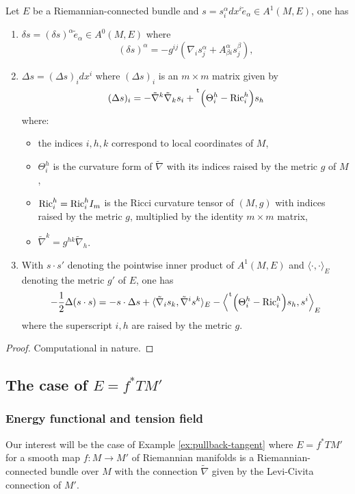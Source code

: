 \begin{lemma}
\label{lem:calculs-general}
Let \(E\) be a Riemannian-connected bundle and \(s = s^\alpha_i dx^i \tilde e_\alpha\in A^1(M,E)\), one has
\begin{enumerate}
\item \(\delta s = (\delta s)^\alpha \tilde e_\alpha \in A^0(M,E)\) where
\[
    (\delta s)^\alpha = -g^{ij}\left(\nabla_i s^\alpha_j + A^\alpha_{\beta i} s^\beta_j \right),
   \]
\item \(\Delta s = (\Delta s)_i dx^i\) where \((\Delta s)_i\) is an \(m\times m\)
matrix given by
\[
    (\Delta s)_i = -{\tilde\nabla}^k {\tilde\nabla}_k s_i + \mskip1mu\prescript{\smash{\mathrm t\mkern-3mu}}{}{\mathstrut\left(\Theta_i^h - {\rm
   Ric}_i^h\right)} s_h
   \]
where:
\begin{itemize}
\item the indices \(i,h,k\) correspond to local coordinates of \(M\),
\item \(\Theta_i^h\) is the curvature form of \(\tilde\nabla\) with its
indices raised by the metric \(g\) of \(M\),
\item \({\rm Ric}_i^h = {\rm Ric}_i^h I_m\) is the Ricci curvature tensor of \((M,g)\) with indices
raised by the metric \(g\), multiplied by the identity \(m\times m\) matrix,
\item \(\tilde \nabla^k = g^{hk}\tilde\nabla_h\).
\end{itemize}
\item With \(s\cdot s'\) denoting the pointwise inner product of \(A^1(M,E)\) and \(\langle \cdot,\cdot \rangle_E\) denoting the metric \(g'\) of \(E\), one has
\begin{equation}
\label{eq:laplace-Q}   
 -\frac{1}{2}\Delta(s\cdot s) =  - s\cdot \Delta s + \langle\tilde\nabla_i s_k,\tilde\nabla^i s^k \rangle_E - \left\langle \mskip1mu\prescript{\smash{\mathrm t\mkern-3mu}}{}{\mathstrut\left(\Theta_i^h - {\rm Ric}_i^h\right)}s_h, s^i\right\rangle_E
\end{equation}
where the superscript \(i,h\) are raised by the metric \(g\).
\end{enumerate}
\end{lemma}
\begin{proof}
Computational in nature.
\end{proof}


\subsection{The case of \(E = f^* TM'\)}
\label{sec:org1158f35}
\label{sec:general-calcul}
\subsubsection{Energy functional and tension field}
\label{sec:org0cd36c1}
Our interest will be the case of Example \ref{ex:pullback-tangent} where \(E =f^*TM'\) for
a smooth map \(f: M \longrightarrow M'\) of Riemannian manifolds is a
Riemannian-connected bundle over \(M\) with the connection \(\tilde\nabla\) given by
the Levi-Civita connection of \(M'\).

